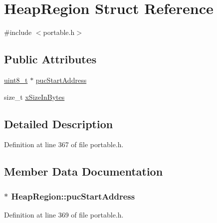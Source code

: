 \hypertarget{struct_heap_region}{}\section{Heap\+Region Struct Reference}
\label{struct_heap_region}


{\ttfamily \#include $<$portable.\+h$>$}

\subsection*{Public Attributes}
\begin{DoxyCompactItemize}
\item 
\hyperlink{_p_e___types_8h_aba7bc1797add20fe3efdf37ced1182c5}{uint8\+\_\+t} $\ast$ \hyperlink{struct_heap_region_aab323508c34642ebfb884a68441d97fc}{puc\+Start\+Address}
\item 
size\+\_\+t \hyperlink{struct_heap_region_a5933b0fd422e70a92ceef839b89a757f}{x\+Size\+In\+Bytes}
\end{DoxyCompactItemize}


\subsection{Detailed Description}


Definition at line 367 of file portable.\+h.



\subsection{Member Data Documentation}
\subsubsection[{\texorpdfstring{puc\+Start\+Address}{pucStartAddress}}]{$\ast$ Heap\+Region\+::puc\+Start\+Address}\hypertarget{struct_heap_region_aab323508c34642ebfb884a68441d97fc}{}\label{struct_heap_region_aab323508c34642ebfb884a68441d97fc}


Definition at line 369 of file portable.\+h.

